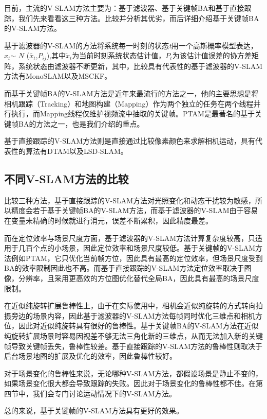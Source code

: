 目前，主流的V-SLAM方法主要为：基于滤波器、基于关键帧BA和基于直接跟踪，我们先来看看这三种方法。比较并分析其优劣，而后详细介绍基于关键帧BA的V-SLAM方法。

基于滤波器的V-SLAM的方法将系统每一时刻的状态\textit{t}用一个高斯概率模型表达，$x_t$$\sim$ $\mathrm{\textit{N}}$ ($\tilde{x_{t}}$,$\mathrm{\textit{P}}_{ij}$),其中$\tilde{x}_t$为当前时刻系统状态估计值，$P_t$为该估计值误差的协方差矩阵，系统状态由滤波器不断更新，其中，比较具有代表性的基于滤波器的V-SLAM方法有MonoSLAM以及MSCKF。

而基于关键帧BA的V-SLAM方法\cite{TriggsB.HartleyR.I.FitzgibbonA.W.2000}是近年来最流行的方法之一，他的主要思想是将相机跟踪（Tracking）和地图构建（Mapping）作为两个独立的任务在两个线程并行执行，而Mapping线程仅维护视频流中抽取的关键帧。PTAM是最著名的基于关键帧BA的方法之一，也是我们介绍的重点。

基于直接跟踪的V-SLAM方法则是直接通过比较像素颜色来求解相机运动，具有代表性的算法有DTAM以及LSD-SLAM。
\subsection{不同V-SLAM方法的比较}
比较三种方法\cite{刘浩敏2016基于单目视觉的同时定位与地图构建方法综述}，基于直接跟踪的V-SLAM方法对光照变化和动态干扰较为敏感，所以精度会若于基于关键帧BA的V-SLAM方法，而基于滤波器的V-SLAM由于容易在变量未精确的时候就进行消元，误差不断累积，因此精度最差。

而在定位效率与场景尺度方面，基于滤波器的V-SLAM方法计算复杂度较高，只适用于几百个点的小场景，因此定位效率和场景尺度较低。基于关键帧的V-SLAM方法例如PTAM，它只优化当前帧方位，因此具有最高的定位效率，但场景尺度受到BA的效率限制因此也不高。而基于直接跟踪的V-SLAM方法定位效率取决于图像，分辨率，且采用更高效的方位图优化替代全局BA，因此具有最高的场景尺度限制。

在近似纯旋转扩展鲁棒性上，由于在实际使用中，相机会近似纯旋转的方式转向拍摄旁边的场景内容，因此基于滤波器的V-SLAM方法每帧同时优化三维点和相机方位，因此对近似纯旋转具有很好的鲁棒性。基于关键帧BA的V-SLAM方法在近似纯旋转扩展场景时容易因视差不够无法三角化新的三维点，从而无法加入新的关键帧导致关键帧丢失，鲁棒性较差。基于直接跟踪的V-SLAM方法的鲁棒性则取决于后台场景地图的扩展及优化的效率，因此鲁棒性较好。

对于场景变化的鲁棒性来说，无论哪种V-SLAM方法，都假设场景是静止不变的，如果场景变化很大都会导致跟踪的失败。因此对于场景变化的鲁棒性都不佳。在第四节中，我们会专门讨论运动情况下的V-SLAM方法。

总的来说，基于关键帧的V-SLAM方法具有更好的效果。

